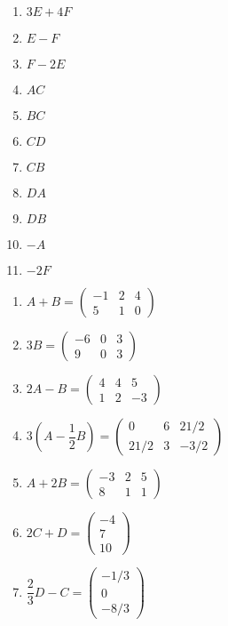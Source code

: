 \documentclass[12pt]{exam}
\begin{document}
\begin{exercicio}
\begin{multicols}{3}
\begin{enumerate}[label={\alph*})]
            \item $3E + 4F$
            \item $E - F$
            \item $F - 2E$
            \item $AC$
            \item $BC$
            \item $CD$
            \item $CB$
            \item $DA$
            \item $DB$
            \item $-A$
            \item $-2F$
        \end{enumerate}
    \end{multicols}
  \begin{solucao}
    \begin{enumerate}[label={\alph*})]
        \item $A + B = \begin{pmatrix} -1 & 2 & 4\\5 & 1 & 0\end{pmatrix}$
        \item $3B = \begin{pmatrix} -6 & 0 & 3\\9 & 0 & 3\end{pmatrix}$
        \item $2A - B = \begin{pmatrix} 4 & 4 & 5\\1 & 2 & -3\end{pmatrix}$
        \item $3(A - \dfrac{1}{2}B) = \begin{pmatrix} 0 & 6 & 21/2\\21/2 & 3 & -3/2\end{pmatrix}$
        \item $A + 2B = \begin{pmatrix} -3 & 2 & 5\\8 & 1 & 1\end{pmatrix}$
        \item $2C + D = \begin{pmatrix} -4\\ 7\\ 10\end{pmatrix}$
        \item $\dfrac{2}{3}D - C = \begin{pmatrix} -1/3\\ 0\\ -8/3\end{pmatrix}$

\end{enumerate}
\end{solucao}
\end{exercicio}
\end{document}
